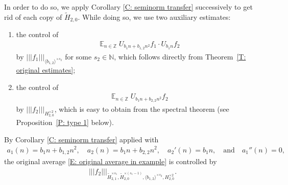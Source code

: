 \documentclass[11pt]{amsart}
\theoremstyle{definition}
\DeclareMathOperator*{\E}{\mathbb{E}}
\newcommand{\N}{{\mathbb N}}
\newcommand{\Z}{{\mathbb Z}}
\newcommand{\nnorm}[1]{\lvert\!|\!| #1|\!|\!\rvert}
\newcommand{\1}{{\mathbf{1}}}
\begin{document}
    In order to do so, we apply Corollary \ref{C: seminorm transfer} successively to get rid of each copy of $\tilde H_{2,0}$. While doing so, we use two auxiliary estimates:
    \begin{enumerate}
        \item the control of 
        \begin{align*}
        \E_{n\in\Z}U_{b_1 n+ b_{1,2} n^2}f_1\cdot U_{b_{1}n}f_2
    \end{align*}        
    by $\nnorm{f_1}_{\langle b_{1,2}\rangle^{\times s_2}}$ for some $s_2\in\N$,
    which follows directly from Theorem~\ref{T: original estimates};
        \item the control of
                \begin{align*}
        \E_{n\in\Z}U_{b_{1}n + b_{2,2}n^2}f_2
    \end{align*}
    by $\nnorm{f_2}_{H_{2,0}^{\times 2}}$, which is easy to obtain from the spectral theorem (see Proposition~\ref{P: type 1} below). 
    \end{enumerate}
    By Corollary \ref{C: seminorm transfer} applied with
    \begin{align*}
        a_1(n) = b_1 n+ b_{1,2} n^2,\quad a_2(n) = b_1 n+ b_{2,2} n^2,\quad a_2'(n) = b_1 n, \quad  \textrm{and}\quad a_1''(n) = 0,
    \end{align*}
    the original average \eqref{E: original average in example} is controlled by
    \begin{align}\label{E: new seminorm in example}
             \nnorm{f_2}_{\tilde H_{2,1}^{\times s_1},\tilde H_{2,0}^{\times (s_1-1)}, \langle b_{1,2}\rangle^{\times s_2}, H_{2,0}^{\times 2}}.   
    \end{align}
\end{document}

